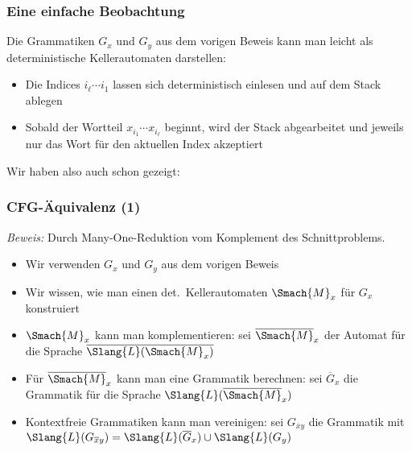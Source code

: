 \documentclass[aspectratio=1610,onlymath]{beamer}
\begin{document}
\begin{frame}\frametitle{Eine einfache Beobachtung}

Die Grammatiken $G_x$ und $G_y$ aus dem vorigen Beweis kann man leicht
als deterministische Kellerautomaten darstellen\pause:
\begin{itemize}
\item Die Indices $i_\ell\cdots i_1$ lassen sich deterministisch einlesen und auf dem Stack ablegen
\item Sobald der Wortteil $x_{i_1}\cdots x_{i_\ell}$ beginnt, wird der Stack abgearbeitet und jeweils nur das Wort für den aktuellen Index akzeptiert
\end{itemize}
\bigskip\pause

Wir haben also auch schon gezeigt:


\end{frame}

\begin{frame}[t]\frametitle{CFG-Äquivalenz (1)}


\emph{Beweis:} Durch Many-One-Reduktion vom Komplement des Schnittproblems.\pause

\begin{itemize}
\item Wir verwenden $G_x$ und $G_y$ aus dem vorigen Beweis\pause
\item Wir wissen, wie man einen det.\ Kellerautomaten $\Smach{M}_x$ für $G_x$ konstruiert\pause
\item $\Smach{M}_x$ kann man komplementieren: sei $\overline{\Smach{M}}_x$ der Automat für
die Sprache $\overline{\Slang{L}(\Smach{M}_x)}$\pause
\item Für $\overline{\Smach{M}}_x$ kann man eine Grammatik berechnen: sei $\overline{G}_x$ die Grammatik für die Sprache $\Slang{L}(\overline{\Smach{M}}_x)$\pause
\item Kontextfreie Grammatiken kann man vereinigen: sei $G_{\overline{x}y}$ die Grammatik mit $\Slang{L}(G_{\overline{x}y})= \Slang{L}(\overline{G}_x)\cup\Slang{L}(G_y)$ 
\end{itemize}

\end{frame}
\end{document}
